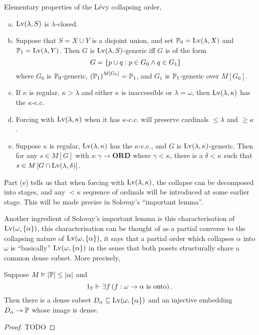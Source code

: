 \begin{lemma} \label{lemma:levy_elementary}
    Elementary properties of the Lévy collapsing order,
    \begin{enumerate}[(a)]
        \item \(\Lv(\lambda,S)\) is \(\lambda\)-closed.
        \item Suppose that \(S = X\cup Y\) is a disjoint union,
            and set \(\P_0 = \Lv(\lambda,X)\) and \(\P_1 = \Lv(\lambda,Y)\).
            Then \(G\) is \(\Lv(\lambda,S)\)-generic iff \(G\) is of the form
            \[G = \set{p\cup q: p\in G_0\land q\in G_1 }\]
            where \(G_0\) is \(\P_0\)-generic, \(\paren{\P_1}^{M[G_0]} = \P_1\),
            and \(G_1\) is \(\P_1\)-generic over \(M[G_0]\).
        \item If \(\kappa\) is regular, \(\kappa > \lambda\) and either \(\kappa\) is inaccessible or \(\lambda = \omega\),
            then \(\Lv(\lambda,\kappa)\) has the \(\kappa\)-c.c.
        \item Forcing with \(\Lv(\lambda,\kappa)\) when it has \(\kappa\)-c.c. will preserve cardinals \(\leq \lambda\) and \(\geq \kappa\).
        \item Suppose \(\kappa\) is regular, \(\Lv(\lambda,\kappa)\) has the \(\kappa\)-c.c., and
            \(G\) is \(\Lv(\lambda,\kappa)\)-generic.
            Then for any \(s\in M[G]\) with \(s:\gamma \to \mathbf{ORD}\) where \(\gamma < \kappa\),
            there is a \(\delta<\kappa\) such that \(s\in M\sq{G\cap\Lv(\lambda,\delta)}\).
    \end{enumerate}
\end{lemma}

\begin{remark}

    Part (e) tells us that when forcing with \(\Lv(\lambda,\kappa)\),
    the collapse can be decomposed into stages, and
    any \(<\kappa\) sequence of ordinals will be introduced at some earlier stage.
    This will be made precise in Solovay's ``important lemma''.
\end{remark}


Another ingredient of Solovay's important lemma is this characterisation of \(\Lv(\omega,\set{\alpha})\),
this characterisation can be thought of as a partial converse to the collapsing nature of \(\Lv(\omega,\set{\alpha})\),
it says that a partial order which collapses \(\alpha\) into \(\omega\) is ``basically'' \(\Lv(\omega,\set{\alpha})\)
in the sense that both posets structurally share a common dense subset.
More precisely,
\begin{lemma}\label{lemma:characterisation_collapse}
    Suppose \(M\models \abs{\P} \leq \abs{\alpha}\) and
    \[ 1_\P \forces \exists f\paren{f:\omega\to\alpha \text{ is onto}}.\]
    Then there is a dense subset \(D_\alpha\subseteq \Lv(\omega,\set{\alpha})\)
    and an injective embedding \(D_\alpha \to \P\) whose image is dense.
\end{lemma}
\begin{proof}
    TODO
\end{proof}

